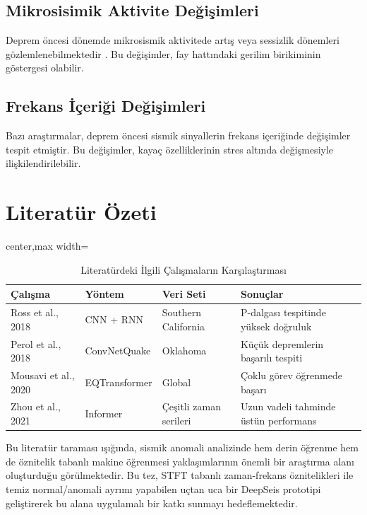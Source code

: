 \subsection{Mikrosisimik Aktivite Değişimleri}

Deprem öncesi dönemde mikrosismik aktivitede artış veya sessizlik dönemleri gözlemlenebilmektedir \cite{scholz1990mechanics}. Bu değişimler, fay hattındaki gerilim birikiminin göstergesi olabilir.

\subsection{Frekans İçeriği Değişimleri}

Bazı araştırmalar, deprem öncesi sismik sinyallerin frekans içeriğinde değişimler tespit etmiştir. Bu değişimler, kayaç özelliklerinin stres altında değişmesiyle ilişkilendirilebilir.

\section{Literatür Özeti}

\begin{table}[htbp]
\centering
\small
\caption{Literatürdeki İlgili Çalışmaların Karşılaştırması}
\begin{adjustbox}{center,max width=\textwidth}
\begin{tabularx}{0.96\textwidth}{p{2.45cm}p{2.45cm}p{3.0cm}X}
\toprule
\textbf{Çalışma} & \textbf{Yöntem} & \textbf{Veri Seti} & \textbf{Sonuçlar} \\
\midrule
Ross et al., 2018 & CNN + RNN & Southern California & P-dalgası tespitinde yüksek doğruluk \\
Perol et al., 2018 & ConvNetQuake & Oklahoma & Küçük depremlerin başarılı tespiti \\
Mousavi et al., 2020 & EQTransformer & Global & Çoklu görev öğrenmede başarı \\
Zhou et al., 2021 & Informer & Çeşitli zaman serileri & Uzun vadeli tahminde üstün performans \\
\bottomrule
\end{tabularx}
\end{adjustbox}
\label{tab:literatur}
\end{table}

Bu literatür taraması ışığında, sismik anomali analizinde hem derin öğrenme hem de öznitelik tabanlı makine öğrenmesi yaklaşımlarının önemli bir araştırma alanı oluşturduğu görülmektedir. Bu tez, STFT tabanlı zaman-frekans öznitelikleri ile temiz normal/anomali ayrımı yapabilen uçtan uca bir DeepSeis prototipi geliştirerek bu alana uygulamalı bir katkı sunmayı hedeflemektedir.
